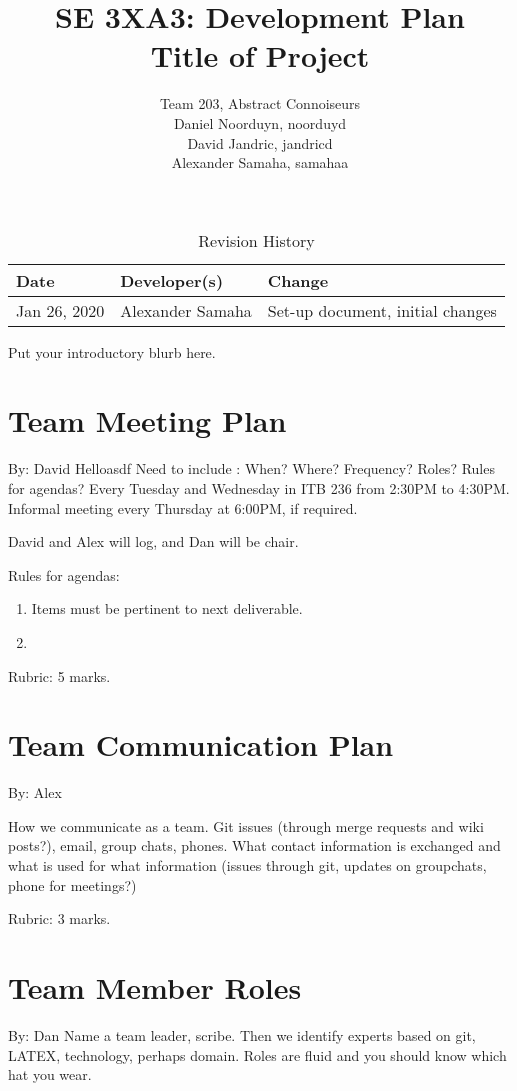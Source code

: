 \documentclass{article}
\title{SE 3XA3: Development Plan\\Title of Project}
\author{Team 203, Abstract Connoiseurs\\
Daniel Noorduyn, noorduyd\\
David Jandric, jandricd\\
Alexander Samaha, samahaa\\
}
\date{}
\begin{document}
\begin{table}[hp]
\caption{Revision History} \label{TblRevisionHistory}
\begin{tabularx}{\textwidth}{llX}
\toprule
\textbf{Date} & \textbf{Developer(s)} & \textbf{Change}\\
\midrule
Jan 26, 2020 & Alexander Samaha & Set-up document, initial changes\\
\bottomrule
\end{tabularx}
\end{table}

\newpage

\maketitle

Put your introductory blurb here.

\section{Team Meeting Plan}

By: David
Helloasdf
Need to include :  When?  Where?  Frequency?  Roles?  Rules for agendas?
Every Tuesday and Wednesday in ITB 236 from 2:30PM to 4:30PM.
Informal meeting every Thursday at 6:00PM, if required.

David and Alex will log, and Dan will be chair.

Rules for agendas:
\begin{enumerate}
    \item Items must be pertinent to next deliverable.
    \item 
\end{enumerate}


Rubric:  5 marks.

\section{Team Communication Plan}
By: Alex

How we communicate as a team.  Git issues (through merge requests and wiki
posts?), email, group chats, phones.  What contact information is exchanged and
what is used for what information (issues through git,  updates on groupchats,
phone for meetings?)

Rubric:  3 marks.

\section{Team Member Roles}
By: Dan
Name  a  team  leader,  scribe.   Then  we  identify  experts  based  on  git,  
LATEX,
technology,  perhaps  domain.   Roles  are  fluid  and  you  should  know  
which  hat
you wear.
\end{document}

